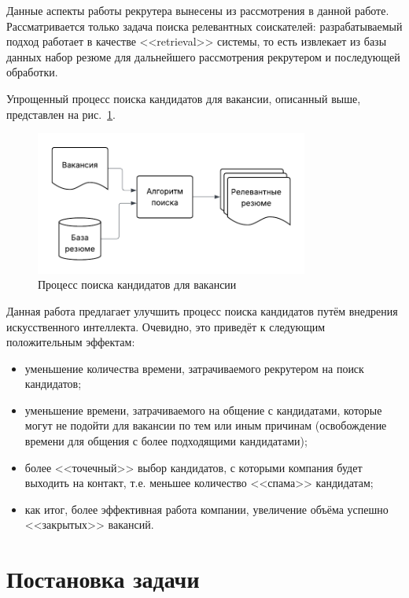 \documentclass[14pt]{mmcs_article}
\begin{document}
Данные аспекты работы рекрутера вынесены из рассмотрения в данной работе. Рассматривается только задача поиска релевантных соискателей: разрабатываемый подход работает в качестве <<retrieval>> системы, то есть извлекает из базы данных набор резюме для дальнейшего рассмотрения рекрутером и последующей обработки.

Упрощенный процесс поиска кандидатов для вакансии, описанный выше, представлен на рис.~\ref{fig:candidate_search_process}.

\begin{figure}[h]
  \centering
  \includegraphics[width=0.8\textwidth]{plots/candidate_search_process.pdf}
  \caption{\centering Процесс поиска кандидатов для вакансии}
  \label{fig:candidate_search_process}
\end{figure}

Данная работа предлагает улучшить процесс поиска кандидатов путём внедрения искусственного интеллекта. Очевидно, это приведёт к следующим положительным эффектам:

\begin{itemize}
  \item уменьшение количества времени, затрачиваемого рекрутером на поиск кандидатов;
  \item уменьшение времени, затрачиваемого на общение с кандидатами, которые могут не подойти для вакансии по тем или иным причинам
        (освобождение времени для общения с более подходящими кандидатами);
  \item более <<точечный>> выбор кандидатов, с которыми компания будет выходить на контакт, т.е. меньшее количество <<спама>> кандидатам;
  \item как итог, более эффективная работа компании, увеличение объёма успешно <<закрытых>> вакансий.
\end{itemize}

\newpage
\section*{Постановка задачи}\label{problem_statement}
\end{document}
